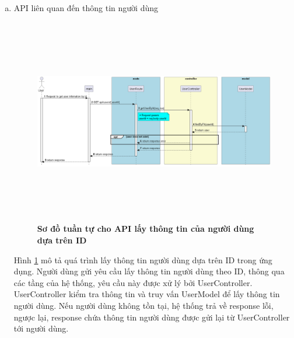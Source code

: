 \begin{enumerate}[a)]


\item  API liên quan đến thông tin người dùng


\begin{figure}[H]
  \centering
  \includegraphics[width=16cm,height=9cm]{Images/server/sequence/server/getUserById.png}
  \caption[Sơ đồ tuần tự cho API lấy thông tin của người dùng dựa trên ID ]{\bfseries \fontsize{12pt}{0pt}
  \selectfont Sơ đồ tuần tự cho API lấy thông tin của người dùng dựa trên ID }
  \label{getUserById} %
\end{figure}
Hình \ref{getUserById} mô tả quá trình lấy thông tin người dùng dựa trên ID trong ứng dụng. Người dùng gửi yêu cầu lấy thông tin người dùng theo ID, thông qua các tầng của hệ thống, yêu cầu này được xử lý bởi UserController. UserController kiểm tra thông tin và truy vấn UserModel để lấy thông tin người dùng. Nếu người dùng không tồn tại, hệ thống trả về response lỗi, ngược lại, response chứa thông tin người dùng được gửi lại từ UserController tới người dùng.



\end{enumerate}

